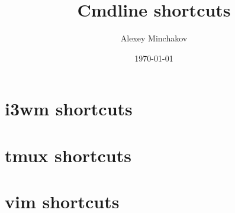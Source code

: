 \documentclass[a4paper, 12pt]{article}
\title{Cmdline shortcuts}
\author{Alexey Minchakov}
\date{\today}
\begin{document}

\section{i3wm shortcuts}


\pagebreak
\section{tmux shortcuts}


\pagebreak
\section{vim shortcuts}

\end{document}
